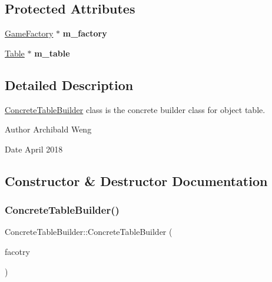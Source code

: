 \subsection*{Protected Attributes}
\begin{DoxyCompactItemize}
\item 
\mbox{\label{class_concrete_table_builder_ac04fa93314b700665c56fea05b9a0ff0}} 
\mbox{\hyperlink{class_game_factory}{Game\+Factory}} $\ast$ {\bfseries m\+\_\+factory}
\item 
\mbox{\label{class_concrete_table_builder_a1600f15904dd5029470bd93f0ccd206f}} 
\mbox{\hyperlink{class_table}{Table}} $\ast$ {\bfseries m\+\_\+table}
\end{DoxyCompactItemize}


\subsection{Detailed Description}
\mbox{\hyperlink{class_concrete_table_builder}{Concrete\+Table\+Builder}} class is the concrete builder class for object table. 

\begin{DoxyAuthor}{Author}
Archibald Weng 
\end{DoxyAuthor}
\begin{DoxyDate}{Date}
April 2018 
\end{DoxyDate}


\subsection{Constructor \& Destructor Documentation}
\mbox{\label{class_concrete_table_builder_aff8b7c167d68b9e71c18888136b53034}} 
\subsubsection{\texorpdfstring{Concrete\+Table\+Builder()}{ConcreteTableBuilder()}}
{\footnotesize\ttfamily Concrete\+Table\+Builder\+::\+Concrete\+Table\+Builder (\begin{DoxyParamCaption}\item[{\mbox{\hyperlink{class_stage1_factory}{Stage1\+Factory}} $\ast$}]{facotry }\end{DoxyParamCaption})\hspace{0.3cm}{\ttfamily [inline]}}

